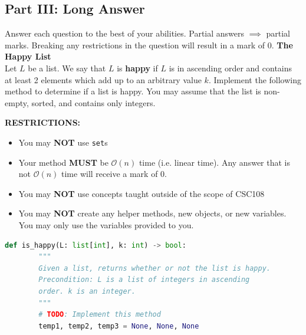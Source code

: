 \documentclass[letterpaper,13pt,addpoints]{exam}
\begin{document}
\begin{questions}

    \clearpage

    \section*{Part III: Long Answer}
    \setcounter{question}{0}
    Answer each question to the best of your abilities. Partial answers $\implies$ partial marks. Breaking any restrictions in the question will result in a mark of 0.
    \question[10] \textbf{The Happy List} \\
    Let $L$ be a list. We say that $L$ is \textbf{happy} if $L$ is in ascending order and contains at least 2 elements which add up to an arbitrary value $k$. Implement the following method to determine if a list is happy. You may assume that the list is non-empty, sorted, and contains only integers.

    \begin{center}

        \textbf{RESTRICTIONS:}
        \begin{itemize}
            \item You may \textbf{NOT} use \texttt{set}s
            \item Your method \textbf{MUST} be $\mathcal{O}(n)$ time (i.e. linear time). Any
                  answer that is not $\mathcal{O}(n)$ time will receive a mark of 0.
            \item You may \textbf{NOT} use concepts taught outside of the scope of CSC108
            \item You may \textbf{NOT} create any helper methods, new objects, or new variables.
                  You may only use the variables provided to you.
        \end{itemize}
    \end{center}

    \begin{lstlisting}[language=Python, style=mystyle]
    def is_happy(L: list[int], k: int) -> bool:
        """
        Given a list, returns whether or not the list is happy.
        Precondition: L is a list of integers in ascending 
        order. k is an integer.
        """
        # TODO: Implement this method
        temp1, temp2, temp3 = None, None, None
    \end{lstlisting}


\end{questions}
\end{document}
